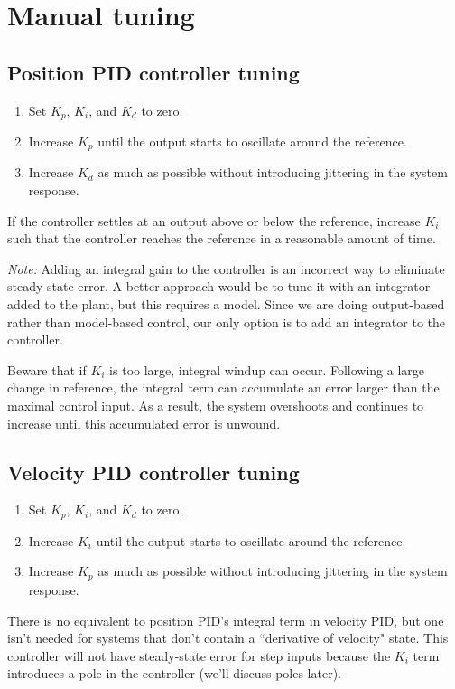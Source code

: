 \section{Manual tuning}

\subsection{Position PID controller tuning}

\begin{enumerate}
  \item Set $K_p$, $K_i$, and $K_d$ to zero.
  \item Increase $K_p$ until the \gls{output} starts to oscillate around the
    \gls{reference}.
  \item Increase $K_d$ as much as possible without introducing jittering in the
    \gls{system response}.
\end{enumerate}

If the \gls{controller} settles at an \gls{output} above or below the
\gls{reference}, increase $K_i$ such that the \gls{controller} reaches the
\gls{reference} in a reasonable amount of time.

\begin{remark}
  \textit{Note:} Adding an integral gain to the \gls{controller} is an incorrect
  way to eliminate \gls{steady-state error}. A better approach would be to tune
  it with an integrator added to the \gls{plant}, but this requires a
  \gls{model}. Since we are doing output-based rather than model-based control,
  our only option is to add an integrator to the \gls{controller}.
\end{remark}

Beware that if $K_i$ is too large, integral windup can occur. Following a large
change in \gls{reference}, the integral term can accumulate an error larger than
the maximal \gls{control input}. As a result, the system overshoots and
continues to increase until this accumulated error is unwound.

\subsection{Velocity PID controller tuning}

\begin{enumerate}
  \item Set $K_p$, $K_i$, and $K_d$ to zero.
  \item Increase $K_i$ until the \gls{output} starts to oscillate around the
    \gls{reference}.
  \item Increase $K_p$ as much as possible without introducing jittering in the
    \gls{system response}.
\end{enumerate}

There is no equivalent to position PID's integral term in velocity PID, but one
isn't needed for systems that don't contain a ``derivative of velocity"
\gls{state}. This controller will not have \gls{steady-state error} for step
inputs because the $K_i$ term introduces a pole in the \gls{controller} (we'll
discuss poles later).
